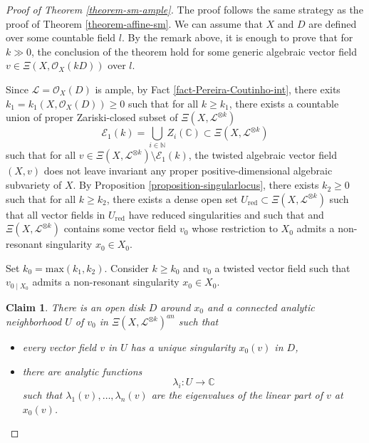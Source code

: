 \documentclass[12pt]{amsart}
\newcommand{\N}{\mathbb{N}}
\theoremstyle{definition}
\theoremstyle{plain}
\newtheorem*{claimproof}{Claim}
\theoremstyle{exampstyle}
\theoremstyle{exampstyle}\newtheorem{thmxbis}{Theorem}
\numberwithin{equation}{section}
\theoremstyle{remark}
\begin{document}
\begin{proof}[Proof of Theorem \ref{theorem-sm-ample}]
The proof follows the same strategy as the proof of Theorem \ref{theorem-affine-sm}. We can assume that $X$ and $D$ are defined over some countable field $l$. By the remark above, it is enough to prove that for $k \gg 0$, the conclusion of the theorem hold for some generic algebraic vector field $v \in \Xi(X,\mathcal O_X(kD))$ over $l$.

Since $\mathcal L = \mathcal O_X(D)$ is ample, by Fact \ref{fact-Pereira-Coutinho-int}, there exits $k_1 = k_1(X,\mathcal O_X(D)) \geq 0$ such that for all $k \geq k_1$, there exists a countable union of proper Zariski-closed subset of $\Xi(X,\mathcal L^{\otimes k})$
$$\mathcal E_1(k) = \bigcup_{i \in \N} Z_i(\mathbb{C}) \subset \Xi(X,\mathcal L^{\otimes k})$$ 
such that for all $v \in  \Xi(X,\mathcal L^{\otimes k}) \setminus \mathcal E_1(k)$, the twisted algebraic vector field $(X,v)$ does  not leave invariant any proper positive-dimensional algebraic subvariety of $X$. By Proposition \ref{proposition-singularlocus}, there exists $k_2 \geq 0$ such that for all $k \geq k_2$, there exists a dense open set 
$U_{\mathrm{red}} \subset \Xi(X,\mathcal L^{\otimes k})$ such that all vector fields in $U_{\mathrm{red}}$ have reduced singularities and such that and  $\Xi(X,\mathcal L^{\otimes k})$ contains some vector field $v_0$ whose restriction to $X_0$ admits a non-resonant singularity $x_0 \in X_0$. 

Set $k_0 = \mathrm{max}(k_1,k_2)$. Consider $k \geq k_0$ and $v_0$ a twisted vector field such that $v_{0 \mid X_0}$ admits a non-resonant singularity $x_0 \in X_0$.


\begin{claimproof} 
There is an open disk $D$ around $x_0$ and a connected analytic neighborhood $U$ of $v_0$ in $\Xi(X,\mathcal L^{\otimes k})^{an}$ such that 
\begin{itemize} 
\item every vector field $v$ in $U$ has a unique singularity $ x_0(v)$ in $D$, 
\item there are analytic functions 
$$\lambda_i: U \rightarrow \mathbb{C}$$ 
such that $\lambda_1(v),\ldots, \lambda_n(v)$ are the eigenvalues of the linear part of $v$ at $x_0(v)$. 
\end{itemize} 
\end{claimproof}


\end{proof}
\end{document}
